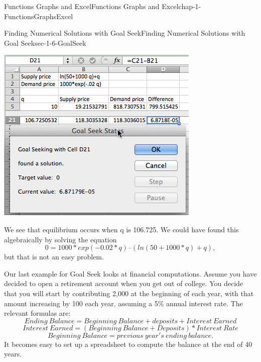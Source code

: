 \documentclass[oneside,10pt,]{book}
\numberwithin{equation}{section}
\begin{document}
\begin{chapterptx}{Functions Graphs and Excel}{}{Functions Graphs and Excel}{}{}{chap-1-FunctionsGraphsExcel}
\begin{sectionptx}{Finding Numerical Solutions with Goal Seek}{}{Finding Numerical Solutions with Goal Seek}{}{}{sec-1-6-GoalSeek}
\begin{sidebyside}{1}{0.1}{0.1}{0}
\begin{sbspanel}{0.8}
\includegraphics[width=1\linewidth]{images/sec1-6-7.png}
\end{sbspanel}%
\end{sidebyside}%
%
\par
\hypertarget{p-485}{}%
We see that equilibrium occurs when q is 106.725.  We could have found this algebraically by solving the equation%
\begin{equation*}
0 = 1000*exp(-0.02*q) – (ln(50 + 1000*q) + q),
\end{equation*}
but that is not an easy problem.%
\par
\hypertarget{p-486}{}%
Our last example for Goal Seek looks at financial computations.  Assume you have decided to open a retirement account when you get out of college.  You decide that you will start by contributing \textdollar{}2,000 at the beginning of each year, with that amount increasing by \textdollar{}100 each year, assuming a 5\% annual interest rate.  The relevant formulas are:%
\begin{equation*}
Ending\ Balance = Beginning\ Balance + deposits + Interest\ Earned
\end{equation*}
%
\begin{equation*}
Interest\ Earned = (Beginning\ Balance + Deposits) * Interest\ Rate
\end{equation*}
%
\begin{equation*}
Beginning\ Balance = previous\ year's\ ending\ balance.
\end{equation*}
It becomes easy to set up a spreadsheet to compute the balance at the end of 40 years. \begin{sidebyside}{1}{0.1}{0.1}{0}%

\end{sidebyside}
\end{sectionptx}
\end{chapterptx}
\end{document}
